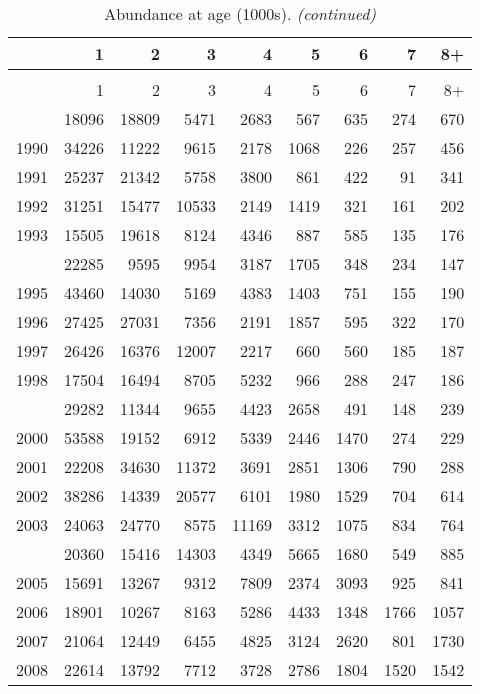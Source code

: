 \documentclass[
]{article}
\begin{document}
\begin{longtable}[t]{lrrrrrrrr}
\caption{\label{tab:NAA-table}Abundance at age (1000s).}\\
\toprule
  & 1 & 2 & 3 & 4 & 5 & 6 & 7 & 8+\\
\midrule
\endfirsthead
\caption[]{Abundance at age (1000s). \textit{(continued)}}\\
\toprule
  & 1 & 2 & 3 & 4 & 5 & 6 & 7 & 8+\\
\midrule
\endhead

\endfoot
\bottomrule
\endlastfoot
1989 & 18096 & 18809 & 5471 & 2683 & 567 & 635 & 274 & 670\\
1990 & 34226 & 11222 & 9615 & 2178 & 1068 & 226 & 257 & 456\\
1991 & 25237 & 21342 & 5758 & 3800 & 861 & 422 & 91 & 341\\
1992 & 31251 & 15477 & 10533 & 2149 & 1419 & 321 & 161 & 202\\
1993 & 15505 & 19618 & 8124 & 4346 & 887 & 585 & 135 & 176\\
\addlinespace
1994 & 22285 & 9595 & 9954 & 3187 & 1705 & 348 & 234 & 147\\
1995 & 43460 & 14030 & 5169 & 4383 & 1403 & 751 & 155 & 190\\
1996 & 27425 & 27031 & 7356 & 2191 & 1857 & 595 & 322 & 170\\
1997 & 26426 & 16376 & 12007 & 2217 & 660 & 560 & 185 & 187\\
1998 & 17504 & 16494 & 8705 & 5232 & 966 & 288 & 247 & 186\\
\addlinespace
1999 & 29282 & 11344 & 9655 & 4423 & 2658 & 491 & 148 & 239\\
2000 & 53588 & 19152 & 6912 & 5339 & 2446 & 1470 & 274 & 229\\
2001 & 22208 & 34630 & 11372 & 3691 & 2851 & 1306 & 790 & 288\\
2002 & 38286 & 14339 & 20577 & 6101 & 1980 & 1529 & 704 & 614\\
2003 & 24063 & 24770 & 8575 & 11169 & 3312 & 1075 & 834 & 764\\
\addlinespace
2004 & 20360 & 15416 & 14303 & 4349 & 5665 & 1680 & 549 & 885\\
2005 & 15691 & 13267 & 9312 & 7809 & 2374 & 3093 & 925 & 841\\
2006 & 18901 & 10267 & 8163 & 5286 & 4433 & 1348 & 1766 & 1057\\
2007 & 21064 & 12449 & 6455 & 4825 & 3124 & 2620 & 801 & 1730\\
2008 & 22614 & 13792 & 7712 & 3728 & 2786 & 1804 & 1520 & 1542\\

\end{longtable}
\end{document}
